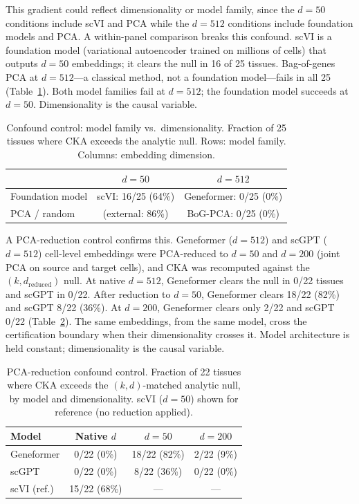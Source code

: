 \documentclass[11pt]{article}
\begin{document}
This gradient could reflect dimensionality or model family, since the
$d = 50$ conditions include scVI and PCA while the $d = 512$ conditions
include foundation models and PCA. A within-panel comparison breaks
this confound. scVI is a foundation model (variational autoencoder
trained on millions of cells) that outputs $d = 50$ embeddings; it
clears the null in 16 of 25 tissues. Bag-of-genes PCA at $d = 512$---a
classical method, not a foundation model---fails in all 25
(Table~\ref{tab:confound}). Both model families fail at $d = 512$; the
foundation model succeeds at $d = 50$. Dimensionality is the causal
variable.

\medskip
\begin{table}[t]
\centering
\caption{Confound control: model family vs.\ dimensionality. Fraction of
25 tissues where CKA exceeds the analytic null. Rows: model family.
Columns: embedding dimension.}
\label{tab:confound}
\small
\begin{tabular}{@{}lcc@{}}
\toprule
& $d = 50$ & $d = 512$ \\
\midrule
Foundation model & scVI: 16/25 (64\%) & Geneformer: 0/25 (0\%) \\
PCA / random     & (external: 86\%)   & BoG-PCA: 0/25 (0\%) \\
\bottomrule
\end{tabular}
\end{table}

A PCA-reduction control confirms this. Geneformer ($d = 512$) and
scGPT ($d = 512$) cell-level embeddings were PCA-reduced to $d = 50$
and $d = 200$ (joint PCA on source and target cells), and CKA was
recomputed against the $(k, d_{\mathrm{reduced}})$ null. At native
$d = 512$, Geneformer clears the null in 0/22 tissues and scGPT in
0/22. After reduction to $d = 50$, Geneformer clears 18/22 (82\%) and
scGPT 8/22 (36\%). At $d = 200$, Geneformer clears only 2/22 and scGPT
0/22 (Table~\ref{tab:pca_reduction}). The same embeddings, from the
same model, cross the certification boundary when their dimensionality
crosses it. Model architecture is held constant; dimensionality is the
causal variable.

\medskip
\begin{table}[t]
\centering
\caption{PCA-reduction confound control. Fraction of 22 tissues where
CKA exceeds the $(k, d)$-matched analytic null, by model and
dimensionality. scVI ($d = 50$) shown for reference (no reduction
applied).}
\label{tab:pca_reduction}
\small
\begin{tabular}{@{}lccc@{}}
\toprule
Model & Native $d$ & $d = 50$ & $d = 200$ \\
\midrule
Geneformer      & 0/22 (0\%)  & 18/22 (82\%) & 2/22 (9\%) \\
scGPT           & 0/22 (0\%)  & 8/22 (36\%)  & 0/22 (0\%) \\
scVI (ref.)     & 15/22 (68\%) & ---         & --- \\
\bottomrule
\end{tabular}
\end{table}
\end{document}
